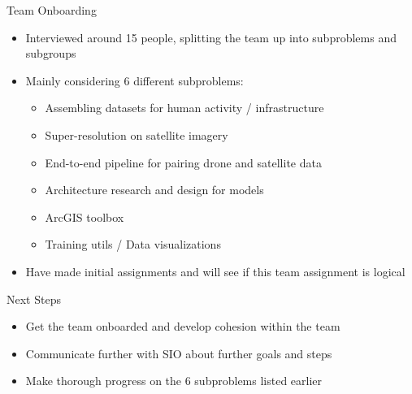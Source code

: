 \begin{frame}{Team Onboarding}
    \centering
    \begin{itemize}
        \item Interviewed around 15 people, splitting the team up into subproblems and subgroups
        \item Mainly considering 6 different subproblems:
        \begin{itemize}
            \item Assembling datasets for human activity / infrastructure
            \item Super-resolution on satellite imagery
            \item End-to-end pipeline for pairing drone and satellite data
            \item Architecture research and design for models
            \item ArcGIS toolbox
            \item Training utils / Data visualizations
        \end{itemize}
        \item Have made initial assignments and will see if this team assignment is logical
    \end{itemize}
\end{frame}

\begin{frame}{Next Steps}
    \begin{itemize}
        \item Get the team onboarded and develop cohesion within the team
        \item Communicate further with SIO about further goals and steps
        \item Make thorough progress on the 6 subproblems listed earlier
    \end{itemize}
\end{frame}